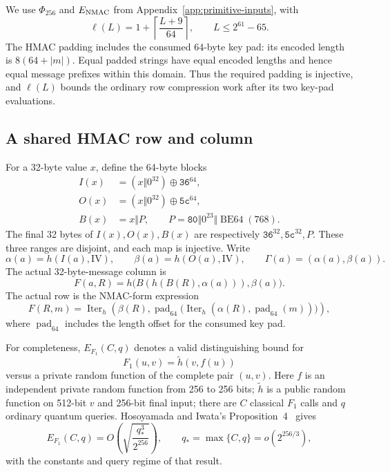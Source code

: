\documentclass[pdflatex]{sn-jnl}
\theoremstyle{thmstyleone}
\theoremstyle{thmstylethree}
\theoremstyle{thmstyletwo}
\begin{document}
We use $\Phi_{256}$ and $E_{\rm NMAC}$ from
Appendix~\ref{app:primitive-inputs}, with
\[
 \ell(L)=1+\left\lceil\frac{L+9}{64}\right\rceil,
 \qquad L\le 2^{61}-65.
\]
The HMAC padding includes the consumed 64-byte key pad: its encoded
length is $8(64+|m|)$. Equal padded strings have equal encoded lengths
and hence equal message prefixes within this domain. Thus the required
padding is injective, and $\ell(L)$ bounds the ordinary row compression
work after its two key-pad evaluations.

\subsection{A shared HMAC row and column}
\label{app:joint-row-column}

For a 32-byte value $x$, define the 64-byte blocks
\[
 \begin{split}
 I(x)&=(x\Vert0^{32})\oplus\mathtt{36}^{64},\\
 O(x)&=(x\Vert0^{32})\oplus\mathtt{5c}^{64},\\
 B(x)&=x\Vert P,\qquad
 P=\mathtt{80}\Vert0^{23}\Vert\operatorname{BE64}(768).
 \end{split}
\]
The final 32 bytes of $I(x),O(x),B(x)$ are respectively
$\mathtt{36}^{32},\mathtt{5c}^{32},P$. These three ranges are disjoint,
and each map is injective. Write
\[
 \alpha(a)=h(I(a),\mathrm{IV}),\qquad
 \beta(a)=h(O(a),\mathrm{IV}),\qquad
 \Gamma(a)=(\alpha(a),\beta(a)).
\]
The actual 32-byte-message column is
\begin{equation}
 F(a,R)=h\bigl(B(h(B(R),\alpha(a))),\beta(a)\bigr).
 \label{eq:appendix-column-compression}
\end{equation}
The actual row is the NMAC-form expression
\[
 F(R,m)=\operatorname{Iter}_h\!\left(
 \beta(R),\operatorname{pad}_{64}
 \bigl(\operatorname{Iter}_h(\alpha(R),\operatorname{pad}_{64}(m))\bigr)
 \right),
\]
where $\operatorname{pad}_{64}$ includes the length offset for the consumed key pad.

For completeness, $E_{F_1}(C,q)$ denotes a valid distinguishing bound for
\[
 F_1(u,v)=\widetilde h(v,f(u))
\]
versus a private random function of the complete pair $(u,v)$.
Here $f$ is an independent private random function from 256 to 256 bits;
$\widetilde h$ is a public random function on 512-bit $v$ and 256-bit final
input; there are $C$ classical $F_1$ calls and $q$ ordinary quantum queries.
Hosoyamada and Iwata's Proposition~4~\cite{hmacqrom2021} gives
\[
 E_{F_1}(C,q)=
 O\!\left(\sqrt{\frac{q_*^3}{2^{256}}}\right),
 \qquad q_*=\max\{C,q\}=o(2^{256/3}),
\]
with the constants and query regime of that result.
\end{document}
